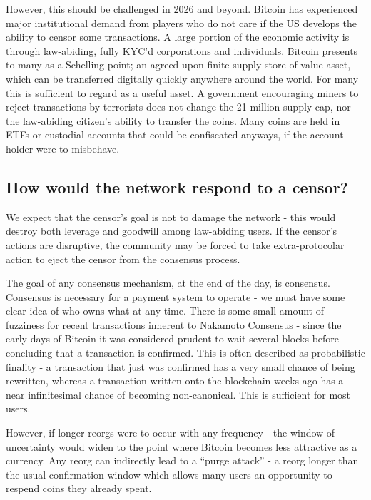 \documentclass{article}%
\begin{document}
However, this should be challenged in 2026 and beyond.  Bitcoin has
experienced major institutional demand from players who do not care if the US
develops the ability to censor some transactions. A large portion of the
economic activity is through law-abiding, fully KYC'd corporations and
individuals.  Bitcoin presents to many as a Schelling point; an agreed-upon finite supply store-of-value asset, which can be transferred digitally quickly anywhere around the
world. For many this is sufficient to regard as a useful asset.  A government encouraging miners to
reject transactions by terrorists does not change the 21 million supply cap,
nor the law-abiding citizen's ability to transfer the coins. Many coins are
held in ETFs or custodial accounts that could be confiscated anyways, if the
account holder were to misbehave.

\subsection{How would the network respond to a censor?}

We expect that the censor's goal is not to damage the network - this would destroy both leverage and goodwill among law-abiding users.  If the
censor's actions are disruptive, the community may be forced to take
extra-protocolar action to eject the censor from the consensus process.

The goal of any consensus mechanism, at the end of the day, is consensus.
 Consensus is necessary for a payment system to operate - we must have some
clear idea of who owns what at any time.  There is some small amount of fuzziness for
recent transactions inherent to Nakamoto Consensus - since the early days of Bitcoin it was considered
prudent to wait several blocks before concluding that a transaction is
confirmed.  This is often described as probabilistic finality - a
transaction that just was confirmed has a very small chance of being
rewritten, whereas a transaction written onto the blockchain weeks ago has a
near infinitesimal chance of becoming non-canonical.  This is sufficient for
most users.

However, if longer reorgs were to occur with any frequency - the window of
uncertainty would widen to the point where Bitcoin becomes less attractive as
a currency.  Any reorg can indirectly lead to a ``purge attack'' \cite{hasu2020purge} - a reorg
longer than the usual confirmation window which allows many users an
opportunity to respend coins they already spent.
\end{document}
